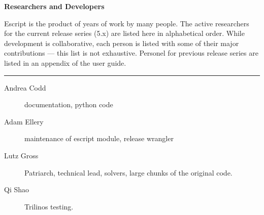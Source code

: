 
%
%
%

\vbox{}
\vfill
\begin{center}
\textbf{\Large Researchers and Developers}
\vspace{0.5cm}

Escript is the product of years of work by many people.
The active researchers for the current release series (5.x) are listed
here in alphabetical order.
While development is collaborative, each person is listed with some of their
major contributions --- this list is not exhaustive.
Personel for previous release series are listed in an appendix of the user
guide.

\vspace{1cm}
\hrule
\vspace{1cm}
\begin{description}
\item[Andrea Codd] documentation, python code
\item[Adam Ellery] maintenance of escript module, release wrangler
\item[Lutz Gross] Patriarch, technical lead, solvers, large chunks of the original code.
\item[Qi Shao] Trilinos testing.
\end{description}
\end{center}
\vfill
\pagebreak

